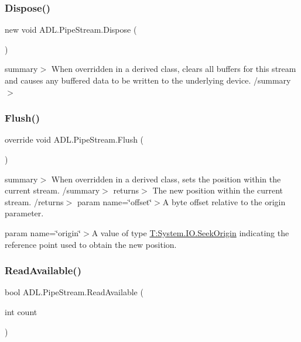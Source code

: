 \subsubsection{\texorpdfstring{Dispose()}{Dispose()}}
{\footnotesize\ttfamily new void A\+D\+L.\+Pipe\+Stream.\+Dispose (\begin{DoxyParamCaption}{ }\end{DoxyParamCaption})}

summary$>$ When overridden in a derived class, clears all buffers for this stream and causes any buffered data to be written to the underlying device. /summary$>$ \mbox{\label{class_a_d_l_1_1_pipe_stream_aef56d04b8d784d6606ed348971eb29f3}} 
\subsubsection{\texorpdfstring{Flush()}{Flush()}}
{\footnotesize\ttfamily override void A\+D\+L.\+Pipe\+Stream.\+Flush (\begin{DoxyParamCaption}{ }\end{DoxyParamCaption})}

summary$>$ When overridden in a derived class, sets the position within the current stream. /summary$>$ returns$>$ The new position within the current stream. /returns$>$ param name=\char`\"{}offset\char`\"{}$>$A byte offset relative to the origin parameter. 

param name=\char`\"{}origin\char`\"{}$>$A value of type \mbox{\hyperlink{}{T\+:\+System.\+I\+O.\+Seek\+Origin}} indicating the reference point used to obtain the new position. \mbox{\label{class_a_d_l_1_1_pipe_stream_a82add2a351991d0f3580d4a198f44675}} 
\subsubsection{\texorpdfstring{Read\+Available()}{ReadAvailable()}}
{\footnotesize\ttfamily bool A\+D\+L.\+Pipe\+Stream.\+Read\+Available (\begin{DoxyParamCaption}\item[{int}]{count }\end{DoxyParamCaption})\hspace{0.3cm}{\ttfamily [private]}}



